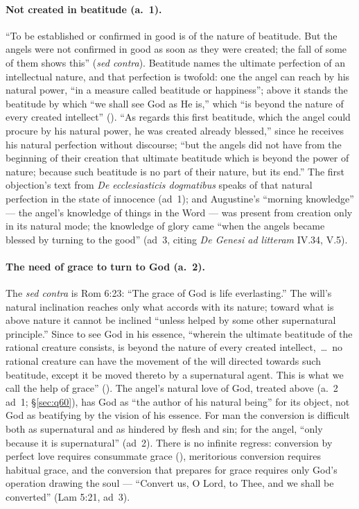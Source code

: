\paragraph{Not created in beatitude (a.~1).} ``To be established or
confirmed in good is of the nature of beatitude. But the angels were not
confirmed in good as soon as they were created; the fall of some of them
shows this'' (\emph{sed contra}). Beatitude names the ultimate
perfection of an intellectual nature, and that perfection is twofold:
one the angel can reach by his natural power, ``in a measure called
beatitude or happiness''; above it stands the beatitude by which ``we
shall see God as He is,'' which ``is beyond the nature of every created
intellect'' (). ``As regards this first
beatitude, which the angel could procure by his natural power, he was
created already blessed,'' since he receives his natural perfection
without discourse; ``but the angels did not have from the beginning of
their creation that ultimate beatitude which is beyond the power of
nature; because such beatitude is no part of their nature, but its
end.'' The first objection's text from \emph{De ecclesiasticis
dogmatibus} speaks of that natural perfection in the state of innocence
(ad~1); and Augustine's ``morning knowledge'' --- the angel's knowledge
of things in the Word --- was present from creation only in its natural
mode; the knowledge of glory came ``when the angels became blessed by
turning to the good'' (ad~3, citing \emph{De Genesi ad litteram} IV.34,
V.5).

\paragraph{The need of grace to turn to God (a.~2).} The \emph{sed
contra} is Rom 6:23: ``The grace of God is life everlasting.'' The
will's natural inclination reaches only what accords with its nature;
toward what is above nature it cannot be inclined ``unless helped by
some other supernatural principle.'' Since to see God in his essence,
``wherein the ultimate beatitude of the rational creature consists, is
beyond the nature of every created intellect,~\dots\ no rational
creature can have the movement of the will directed towards such
beatitude, except it be moved thereto by a supernatural agent. This is
what we call the help of grace'' (). The angel's
natural love of God, treated above (a.~2 ad~1; \S\ref{sec:q60}), has God
as ``the author of his natural being'' for its object, not God as
beatifying by the vision of his essence. For man the conversion is
difficult both as supernatural and as hindered by flesh and sin; for the
angel, ``only because it is supernatural'' (ad~2). There is no infinite
regress: conversion by perfect love requires consummate grace
(), meritorious conversion requires habitual
grace, and the conversion that prepares for grace requires only God's
operation drawing the soul --- ``Convert us, O Lord, to Thee, and we
shall be converted'' (Lam 5:21, ad~3).

